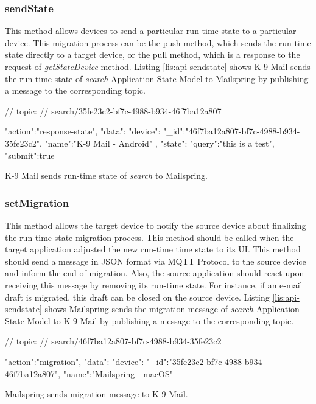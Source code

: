 \subsubsection{sendState}
This method allows devices to send a particular run-time state to a particular device. This migration process can be the push method, which sends the run-time state directly to a target device, or the pull method, which is a response to the request of \textit{getStateDevice} method. Listing \ref{lis:api-sendstate} shows K-9 Mail sends the run-time state of \textit{search} Application State Model to Mailspring by publishing a message to the corresponding topic.


\FloatBarrier
\begin{code}
\begin{js2}
// topic:
// search/35fe23c2-bf7c-4988-b934-46f7ba12a807
\end{js2}

\begin{json}
{
   "action":"response-state",
   "data":{
      "device":{
         "_id":"46f7ba12a807-bf7c-4988-b934-35fe23c2",
         "name":"K-9 Mail - Android"
      },
      "state":{
         "query":"this is a test",
         "submit":true
      }
   }
}
\end{json}
\caption{K-9 Mail sends run-time state of \textit{search} to Mailspring.}
\label{lis:api-sendstate}
\end{code}
\FloatBarrier

\subsubsection{setMigration}
This method allows the target device to notify the source device about finalizing the run-time state migration process. This method should be called when the target application adjusted the new run-time time state to its UI. This method should send a message in JSON format via MQTT Protocol to the source device and inform the end of migration. Also, the source application should react upon receiving this message by removing its run-time state. For instance, if an e-mail draft is migrated, this draft can be closed on the source device. Listing \ref{lis:api-sendstate} shows Mailspring sends the migration message of \textit{search} Application State Model to K-9 Mail by publishing a message to the corresponding topic.

\FloatBarrier
\begin{code}
\begin{js2}
// topic:
// search/46f7ba12a807-bf7c-4988-b934-35fe23c2
\end{js2}

\begin{json}
{
   "action":"migration",
   "data":{
      "device":{
         "_id":"35fe23c2-bf7c-4988-b934-46f7ba12a807",
         "name":"Mailspring - macOS"
      }
   }
}
\end{json}
\caption{Mailspring sends migration message to K-9 Mail.}
\label{lis:api-setmigration}
\end{code}
\FloatBarrier

